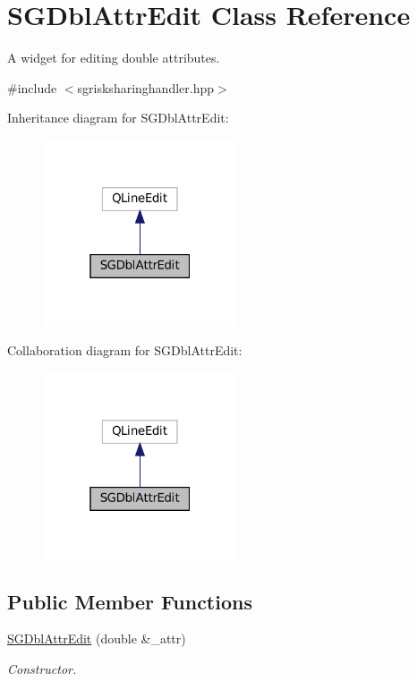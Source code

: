 \hypertarget{classSGDblAttrEdit}{}\section{S\+G\+Dbl\+Attr\+Edit Class Reference}
\label{classSGDblAttrEdit}


A widget for editing double attributes.  




{\ttfamily \#include $<$sgrisksharinghandler.\+hpp$>$}



Inheritance diagram for S\+G\+Dbl\+Attr\+Edit\+:
\nopagebreak
\begin{figure}[H]
\begin{center}
\leavevmode
\includegraphics[width=163pt]{classSGDblAttrEdit__inherit__graph}
\end{center}
\end{figure}


Collaboration diagram for S\+G\+Dbl\+Attr\+Edit\+:
\nopagebreak
\begin{figure}[H]
\begin{center}
\leavevmode
\includegraphics[width=163pt]{classSGDblAttrEdit__coll__graph}
\end{center}
\end{figure}
\subsection*{Public Member Functions}
\begin{DoxyCompactItemize}
\item 
\mbox{\label{classSGDblAttrEdit_a4181190c83ed858568c41d9bdd4de5fd}} 
\hyperlink{classSGDblAttrEdit_a4181190c83ed858568c41d9bdd4de5fd}{S\+G\+Dbl\+Attr\+Edit} (double \&\+\_\+attr)
\begin{DoxyCompactList}\small\item\em Constructor. \end{DoxyCompactList}\end{DoxyCompactItemize}
